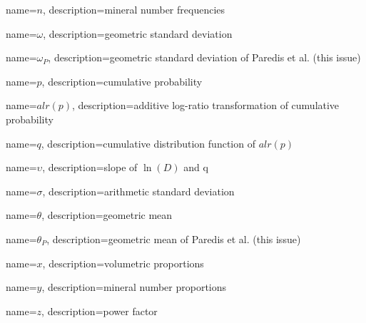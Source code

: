 {
    name={\ensuremath{n}},
    description={mineral number frequencies}
}

{
    name={\ensuremath{\omega}},
    description={geometric standard deviation}
}

{
    name={\ensuremath{\omega_{P}}},
    description={geometric standard deviation of Paredis et al. (this issue)}
}

{
    name={\ensuremath{p}},
    description={cumulative probability}
}

{
    name={\ensuremath{alr(p)}},
    description={additive log-ratio transformation of cumulative probability}
}

{
    name={\ensuremath{q}},
    description={cumulative distribution function of \(alr(p)\)}
}

{
    name={\ensuremath{\upsilon}},
    description={slope of \(\ln(D)\) and q}
}

{
    name={\ensuremath{\sigma}},
    description={arithmetic standard deviation}
}

{
    name={\ensuremath{\theta}},
    description={geometric mean}
}

{
    name={\ensuremath{\theta_{P}}},
    description={geometric mean of Paredis et al. (this issue)}
}

{
    name={\ensuremath{x}},
    description={volumetric proportions}
}

{
    name={\ensuremath{y}},
    description={mineral number proportions}
}

{
    name={\ensuremath{z}},
    description={power factor}
}

